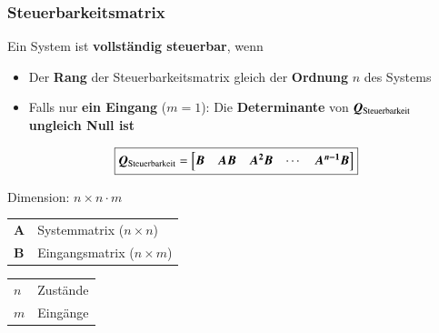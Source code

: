 

\subsubsection{Steuerbarkeitsmatrix}

Ein System ist \textbf{vollständig steuerbar}, wenn
\begin{itemize}
    \item Der \textbf{Rang} der Steuerbarkeitsmatrix gleich der \textbf{Ordnung} $n$ des Systems
    \item Falls nur \textbf{ein Eingang} ($m = 1$): Die \textbf{Determinante} von $\bm{Q}_{\rm Steuerbarkeit}$ 
        \textbf{ungleich Null ist}
\end{itemize}

\begin{minipage}[c]{0.6\columnwidth}
    $$ \boxed{ \bm{Q}_{\rm Steuerbarkeit} = 
    \begin{bmatrix}
        \bm{B} & \bm{A B} & \bm{A^2 B} & \cdots & \bm{A^{n-1} B} 
    \end{bmatrix} } $$
\end{minipage}
\hfill
\begin{minipage}[c]{0.38\columnwidth}
    Dimension: $n \times n \cdot m$
\end{minipage}


\begin{minipage}[c]{0.48\columnwidth}
    \begin{tabular}{ll}
        $\bm{A}$    & Systemmatrix ($n \times n$) \\
        $\bm{B}$    & Eingangsmatrix ($n \times m$) \\
    \end{tabular}
\end{minipage}
\hfill
\begin{minipage}[c]{0.48\columnwidth}
    \begin{tabular}{ll}
        $n$         & Zustände \\
        $m$         & Eingänge \\
    \end{tabular}
\end{minipage}


